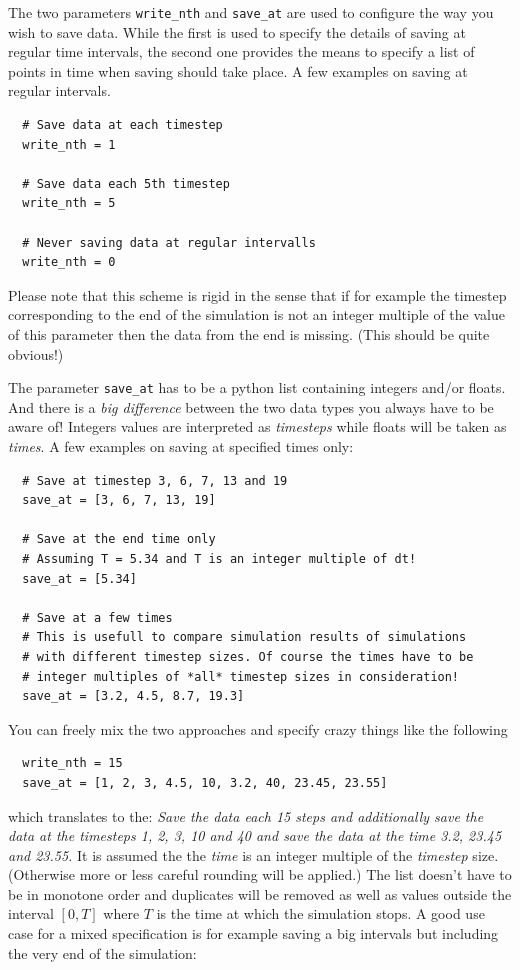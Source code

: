 \documentclass[a4paper,10pt]{report}
\begin{document}
The two parameters \verb|write_nth| and \verb|save_at| are used to configure the
way you wish to save data. While the first is used to specify the details of saving
at regular time intervals, the second one provides the means to specify a list
of points in time when saving should take place. A few examples on saving at regular
intervals.

\begin{verbatim}
  # Save data at each timestep
  write_nth = 1

  # Save data each 5th timestep
  write_nth = 5

  # Never saving data at regular intervalls
  write_nth = 0
\end{verbatim}

Please note that this scheme is rigid in the sense that if for example the timestep
corresponding to the end of the simulation is not an integer multiple of the value
of this parameter then the data from the end is missing. (This should be quite obvious!)

The parameter \verb|save_at| has to be a python list containing integers
and/or floats. And there is a \emph{big difference} between the two data types
you always have to be aware of! Integers values are interpreted as \emph{timesteps}
while floats will be taken as \emph{times}. A few examples on saving at specified
times only:

\begin{verbatim}
  # Save at timestep 3, 6, 7, 13 and 19
  save_at = [3, 6, 7, 13, 19]

  # Save at the end time only
  # Assuming T = 5.34 and T is an integer multiple of dt!
  save_at = [5.34]

  # Save at a few times
  # This is usefull to compare simulation results of simulations
  # with different timestep sizes. Of course the times have to be
  # integer multiples of *all* timestep sizes in consideration!
  save_at = [3.2, 4.5, 8.7, 19.3]
\end{verbatim}

You can freely mix the two approaches and specify crazy things like
the following

\begin{verbatim}
  write_nth = 15
  save_at = [1, 2, 3, 4.5, 10, 3.2, 40, 23.45, 23.55]
\end{verbatim}

which translates to the: \emph{Save the data each 15 steps and additionally
save the data at the timesteps 1, 2, 3, 10 and 40 and save the data at the time 3.2,
23.45 and 23.55.} It is assumed the the \emph{time} is an integer multiple of the
\emph{timestep} size. (Otherwise more or less careful rounding will be applied.)
The list doesn't have to be in monotone order and duplicates will be removed as well
as values outside the interval $[0, T]$ where $T$ is the time at which the simulation
stops. A good use case for a mixed specification is for example saving a big
intervals but including the very end of the simulation:
\end{document}
